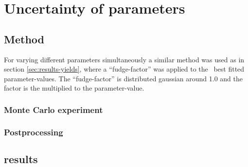 \section{Uncertainty of parameters}

\subsection{Method}
For varying different parameters simultaneously a similar method was used as in section \ref{sec:results-yields}, where a ``fudge-factor'' was applied to the \eris\ best fitted parameter-values. The ``fudge-factor'' is distributed gaussian around 1.0 and the factor is the multiplied to the parameter-value.


\subsubsection{Monte Carlo experiment}

\subsubsection{Postprocessing}


\subsection{results}

